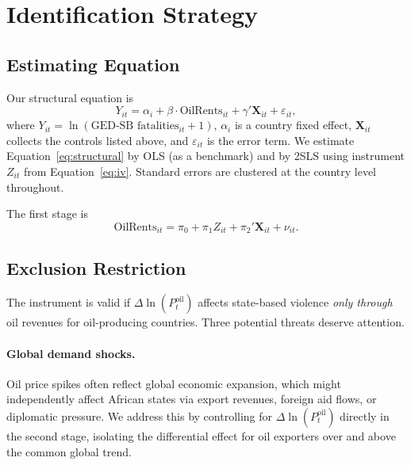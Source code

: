 \documentclass[12pt]{article}
\begin{document}
\section{Identification Strategy}
\label{sec:strategy}

\subsection{Estimating Equation}

Our structural equation is
\begin{equation}
  Y_{it} = \alpha_i + \beta \cdot \text{OilRents}_{it} +
           \gamma' \mathbf{X}_{it} + \varepsilon_{it},
  \label{eq:structural}
\end{equation}
where $Y_{it} = \ln(\text{GED-SB fatalities}_{it}+1)$,
$\alpha_i$ is a country fixed effect,
$\mathbf{X}_{it}$ collects the controls listed above, and
$\varepsilon_{it}$ is the error term.
We estimate Equation~\eqref{eq:structural} by OLS (as a benchmark)
and by 2SLS using instrument $Z_{it}$ from Equation~\eqref{eq:iv}.
Standard errors are clustered at the country level throughout.

The first stage is
\begin{equation}
  \text{OilRents}_{it} = \pi_0 + \pi_1 Z_{it} +
                          \pi_2' \mathbf{X}_{it} + \nu_{it}.
  \label{eq:firststage}
\end{equation}

\subsection{Exclusion Restriction}

The instrument is valid if $\Delta\ln(P^{\text{oil}}_t)$
affects state-based violence \emph{only through} oil revenues for
oil-producing countries.
Three potential threats deserve attention.

\paragraph{Global demand shocks.}
Oil price spikes often reflect global economic expansion, which might
independently affect African states via export revenues, foreign aid flows,
or diplomatic pressure.
We address this by controlling for $\Delta\ln(P^{\text{oil}}_t)$ directly
in the second stage, isolating the differential effect for oil exporters
over and above the common global trend.
\end{document}
